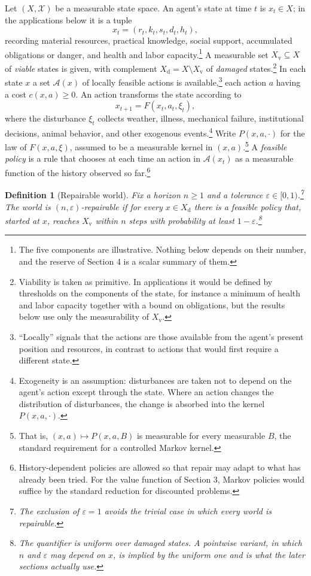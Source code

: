 \documentclass[11pt]{article}
\newtheorem{definition}{Definition}
\theoremstyle{remark}
\newcommand{\Xv}{X_{\mathrm{v}}}
\newcommand{\Xd}{X_{\mathrm{d}}}
\begin{document}
Let $(X,\mathcal X)$ be a measurable state space. An agent's state at time $t$ is $x_t\in X$; in the applications below it is a tuple
\[
x_t=(r_t,k_t,s_t,d_t,h_t),
\]
recording material resources, practical knowledge, social support, accumulated obligations or danger, and health and labor capacity.\footnote{The five components are illustrative. Nothing below depends on their number, and the reserve of Section 4 is a scalar summary of them.} A measurable set $\Xv\subseteq X$ of \emph{viable} states is given, with complement $\Xd=X\setminus\Xv$ of \emph{damaged} states.\footnote{Viability is taken as primitive. In applications it would be defined by thresholds on the components of the state, for instance a minimum of health and labor capacity together with a bound on obligations, but the results below use only the measurability of $\Xv$.} In each state $x$ a set $\mathcal A(x)$ of locally feasible actions is available,\footnote{``Locally'' signals that the actions are those available from the agent's present position and resources, in contrast to actions that would first require a different state.} each action $a$ having a cost $c(x,a)\ge 0$. An action transforms the state according to
\[
x_{t+1}=F(x_t,a_t,\xi_t),
\]
where the disturbance $\xi_t$ collects weather, illness, mechanical failure, institutional decisions, animal behavior, and other exogenous events.\footnote{Exogeneity is an assumption: disturbances are taken not to depend on the agent's action except through the state. Where an action changes the distribution of disturbances, the change is absorbed into the kernel $P(x,a,\cdot)$.} Write $P(x,a,\cdot)$ for the law of $F(x,a,\xi)$, assumed to be a measurable kernel in $(x,a)$.\footnote{That is, $(x,a)\mapsto P(x,a,B)$ is measurable for every measurable $B$, the standard requirement for a controlled Markov kernel.} A \emph{feasible policy} is a rule that chooses at each time an action in $\mathcal A(x_t)$ as a measurable function of the history observed so far.\footnote{History-dependent policies are allowed so that repair may adapt to what has already been tried. For the value function of Section 3, Markov policies would suffice by the standard reduction for discounted problems.}

\begin{definition}[Repairable world]
Fix a horizon $n\ge1$ and a tolerance $\varepsilon\in[0,1)$.\footnote{The exclusion of $\varepsilon=1$ avoids the trivial case in which every world is repairable.} The world is \emph{$(n,\varepsilon)$-repairable} if for every $x\in\Xd$ there is a feasible policy that, started at $x$, reaches $\Xv$ within $n$ steps with probability at least $1-\varepsilon$.\footnote{The quantifier is uniform over damaged states. A pointwise variant, in which $n$ and $\varepsilon$ may depend on $x$, is implied by the uniform one and is what the later sections actually use.}
\end{definition}
\end{document}
